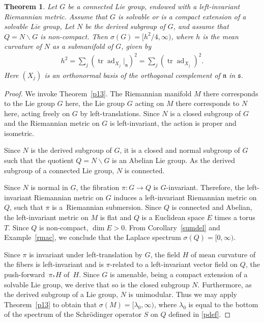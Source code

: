 \documentclass[pdftex]{sigma}
\numberwithin{equation}{section}
\newtheorem{Theorem}{Theorem}[section]
\DeclareMathOperator{\ad}{ad}
\DeclareMathOperator{\tr}{tr}
\begin{document}
\begin{Theorem}\label{specsn}
Let $G$ be a connected Lie group, endowed with a left-invariant Riemannian metric.
Assume that $G$ is solvable or is a compact extension of a solvable Lie group,
Let $N$ be the derived subgroup of $G$, and assume that $Q=N\backslash G$ is non-compact.
Then $\sigma(G)=\bigl[h^2/4,\infty\bigr)$, where $h$ is the mean curvature of $N$ as a submanifold of $G$,
given by
\begin{align*}
	h^2 = \sum_j (\tr\ad_{X_j}|_{\mathfrak n})^2
	= \sum_j (\tr\ad_{X_j})^2.
\end{align*}
Here $(X_j)$ is an orthonormal basis of the orthogonal complement of $\mathfrak n$ in $\mathfrak s$.
\end{Theorem}

\begin{proof}
We invoke Theorem~\ref{p13}.
The Riemannian manifold $M$ there corresponds to the Lie group $G$ here,
the Lie group $G$ acting on $M$ there corresponds to $N$ here, acting freely on $G$ by left-translations.
Since $N$ is a closed subgroup of $G$ and the Riemannian metric on $G$ is left-invariant,
the action is proper and isometric.

Since $N$ is the derived subgroup of $G$, it is a closed and normal subgroup of $G$
such that the quotient $Q=N\backslash G$ is an Abelian Lie group.
As the derived subgroup of a connected Lie group, $N$ is connected.

Since $N$ is normal in $G$, the fibration $\pi\colon G\to Q$ is $G$-invariant.
Therefore, the left-invariant Riemannian metric on $G$ induces a left-invariant Riemannian metric on $Q$,
such that $\pi$ is a~Riemannian submersion.
Since $Q$ is connected and Abelian, the left-invariant metric on $M$ is flat
and $Q$ is a Euclidean space $E$ times a torus $T$.
Since $Q$ is non-compact, $\dim E>0$.
From Corollary~\ref{sumdel} and Example~\ref{rmac},
we conclude that the Laplace spectrum $\sigma(Q)=[0,\infty)$.

Since $\pi$ is invariant under left-translation by $G$,
the field $H$ of mean curvature of the fibers is left-invariant and is $\pi$-related
to a left-invariant vector field on $Q$, the push-forward~$\pi_*H$ of~$H$.
Since $G$ is amenable, being a compact extension of a solvable Lie group,
we derive that so is the closed subgroup $N$.
Furthermore, as the derived subgroup of a Lie group, $N$ is unimodular.
Thus we may apply Theorem~\ref{p13} to obtain that $\sigma(M)=[\lambda_0,\infty)$,
where $\lambda_0$ is equal to the bottom of the spectrum of the Schr\"odinger operator $S$ on $Q$ defined in \eqref{pdef}.


\end{proof}
\end{document}
